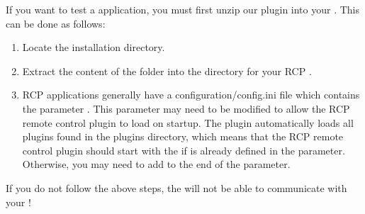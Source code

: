 
If you want to test a  application, you
must first unzip our  plugin into your
\gdaut{}. This can be done as follows:


\begin{enumerate}
\item Locate the \app{} installation directory.
\item Extract the content of the  folder into the  directory for your RCP \gdaut{}.
\item RCP applications generally have a configuration/config.ini file which contains the parameter . This parameter may need to be modified to allow the RCP remote control plugin to load on \gdaut{} startup. The  plugin automatically loads all plugins found in the plugins directory, which means that the RCP remote control plugin should start with the \gdaut{} if  is already defined in the  parameter. Otherwise, you may need to add   to the end of the  parameter.
\end{enumerate}

If you do not follow the above steps, the \gdagent{} will not be able to
communicate with your \gdaut{}!


